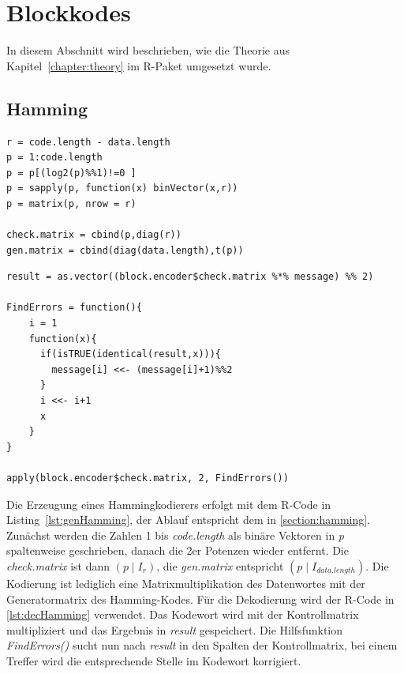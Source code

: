 \section{Blockkodes}
\label{section:impl_block}
In diesem Abschnitt wird beschrieben, wie die Theorie aus Kapitel~\ref{chapter:theory} im R-Paket umgesetzt wurde.

\subsection{Hamming}

\begin{lstlisting}[caption=Erzeugung der Generator- und Kontrollmatrix, label={lst:genHamming}, float=t]
r = code.length - data.length
p = 1:code.length
p = p[(log2(p)%%1)!=0 ]
p = sapply(p, function(x) binVector(x,r))
p = matrix(p, nrow = r)

check.matrix = cbind(p,diag(r))
gen.matrix = cbind(diag(data.length),t(p))
\end{lstlisting}

\begin{lstlisting}[caption=Dekodierung eines Hamming-Kodes, label={lst:decHamming}, float=t]
result = as.vector((block.encoder$check.matrix %*% message) %% 2)

FindErrors = function(){
    i = 1
    function(x){
      if(isTRUE(identical(result,x))){
      	message[i] <<- (message[i]+1)%%2
      }
      i <<- i+1
      x
    }
}

apply(block.encoder$check.matrix, 2, FindErrors())

\end{lstlisting}

Die Erzeugung eines Hammingkodierers erfolgt mit dem R-Code in Listing~\ref{lst:genHamming}, der Ablauf entspricht dem in \ref{section:hamming}. Zunächst werden die Zahlen 1 bis \emph{code.length} als binäre Vektoren in \emph{p} spaltenweise geschrieben, danach die 2er Potenzen wieder entfernt. Die \emph{check.matrix} ist dann $(p \mid I_r)$, die \emph{gen.matrix} entspricht $(p \mid I_{data.length})$.
\newblock
Die Kodierung ist lediglich eine Matrixmultiplikation des Datenwortes mit der Generatormatrix des Hamming-Kodes. Für die Dekodierung wird der R-Code in \ref{lst:decHamming} verwendet. Das Kodewort wird mit der Kontrollmatrix multipliziert und das Ergebnis in \emph{result} gespeichert. Die Hilfsfunktion \emph{FindErrors()} sucht nun nach \emph{result} in den Spalten der Kontrollmatrix, bei einem Treffer wird die entsprechende Stelle im Kodewort korrigiert.



